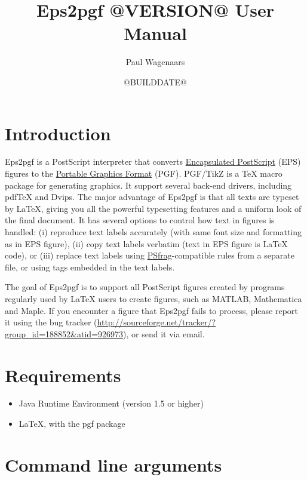 \documentclass{article}
\title{Eps2pgf @VERSION@ User Manual}
\author{Paul Wagenaars}
\date{@BUILDDATE@}
\begin{document}
    \maketitle
    \tableofcontents

    \section{Introduction}
    Eps2pgf is a PostScript interpreter that converts \href{http://en.wikipedia.org/wiki/Encapsulated_PostScript}{Encapsulated PostScript} (EPS) figures to the \href{http://sourceforge.net/projects/pgf/}{Portable Graphics Format} (PGF). PGF/TikZ is a \TeX{} macro package for generating graphics. It support several back-end drivers, including pdf\TeX{} and Dvips. The major advantage of Eps2pgf is that all texts are typeset by \LaTeX, giving you all the powerful typesetting features and a uniform look of the final document. It has several options to control how text in figures is handled: (i) reproduce text labels accurately (with same font size and formatting as in EPS figure), (ii) copy text labels verbatim (text in EPS figure is \LaTeX{} code), or (iii) replace text labels using \href{http://www.ctan.org/tex-archive/help/Catalogue/entries/psfrag.html}{\textsf{PSfrag}}-compatible rules from a separate file, or using tags embedded in the text labels.

    The goal of Eps2pgf is to support all PostScript figures created by programs regularly used by \LaTeX{} users to create figures, such as MATLAB, Mathematica and Maple. If you encounter a figure that Eps2pgf fails to process, please report it using the bug tracker (\url{http://sourceforge.net/tracker/?group_id=188852&atid=926973}), or send it via email.

    \section{Requirements}
    \begin{itemize}
        \item Java Runtime Environment (version 1.5 or higher)
        \item \LaTeX{}, with the \textsf{pgf} package
    \end{itemize}

    \section{Command line arguments}
\end{document}
